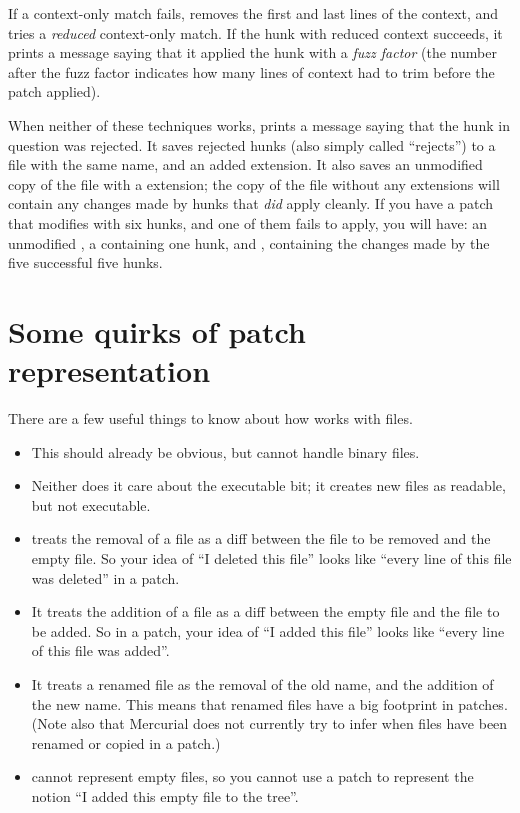 If a context-only match fails,  removes the first and
last lines of the context, and tries a \emph{reduced} context-only
match.  If the hunk with reduced context succeeds, it prints a message
saying that it applied the hunk with a \emph{fuzz factor} (the number
after the fuzz factor indicates how many lines of context
 had to trim before the patch applied).

When neither of these techniques works,  prints a
message saying that the hunk in question was rejected.  It saves
rejected hunks (also simply called ``rejects'') to a file with the
same name, and an added  extension.  It also saves an
unmodified copy of the file with a  extension; the
copy of the file without any extensions will contain any changes made
by hunks that \emph{did} apply cleanly.  If you have a patch that
modifies  with six hunks, and one of them fails to
apply, you will have: an unmodified , a
 containing one hunk, and , containing
the changes made by the five successful five hunks.

\section{Some quirks of patch representation}

There are a few useful things to know about how  works
with files.
\begin{itemize}
\item This should already be obvious, but  cannot
  handle binary files.
\item Neither does it care about the executable bit; it creates new
  files as readable, but not executable.
\item {} treats the removal of a file as a diff between
  the file to be removed and the empty file.  So your idea of ``I
  deleted this file'' looks like ``every line of this file was
  deleted'' in a patch.
\item It treats the addition of a file as a diff between the empty
  file and the file to be added.  So in a patch, your idea of ``I
  added this file'' looks like ``every line of this file was added''.
\item It treats a renamed file as the removal of the old name, and the
  addition of the new name.  This means that renamed files have a big
  footprint in patches.  (Note also that Mercurial does not currently
  try to infer when files have been renamed or copied in a patch.)
\item {} cannot represent empty files, so you cannot use
  a patch to represent the notion ``I added this empty file to the
  tree''.
\end{itemize}
